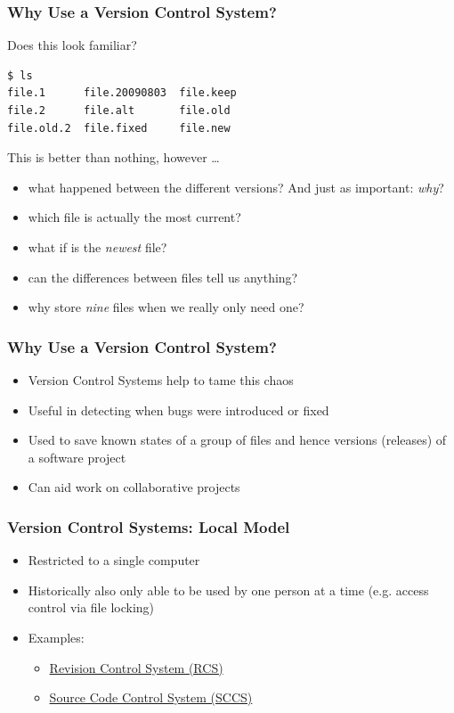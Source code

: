 \begin{frame}[fragile]
\frametitle{Why Use a Version Control System?}

Does this look familiar?

\begin{lstlisting}
$ ls
file.1      file.20090803  file.keep
file.2      file.alt       file.old
file.old.2  file.fixed     file.new
\end{lstlisting}

This is better than nothing, however \ldots
\begin{itemize}
    \item what happened between the different versions?  And just as
        important: \emph{why}?
    \item which file is actually the most current?
    \item what if  is the \emph{newest} file?
    \item can the differences between files tell us anything?
    \item why store \emph{nine} files when we really only need one?
\end{itemize}
\end{frame}

\begin{frame}
\frametitle{Why Use a Version Control System?}
\begin{itemize}
    \item Version Control Systems help to tame this chaos
    \item Useful in detecting when bugs were introduced or fixed
    \item Used to save known states of a group of files and hence versions
        (releases) of a software project
    \item Can aid work on collaborative projects
\end{itemize}
\end{frame}

\begin{frame}
\frametitle{Version Control Systems: Local Model}
\begin{itemize}
    \item Restricted to a single computer
    \item Historically also only able to be used by one person at a time
        (e.g. access control via file locking)
    \item Examples:
        \begin{itemize}
            \item \href{https://en.wikipedia.org/wiki/Revision_Control_System}
                       {Revision Control System (RCS)}
            \item \href{https://en.wikipedia.org/wiki/Source_Code_Control_System}
                       {Source Code Control System (SCCS)}
        \end{itemize}
\end{itemize}
\end{frame}

